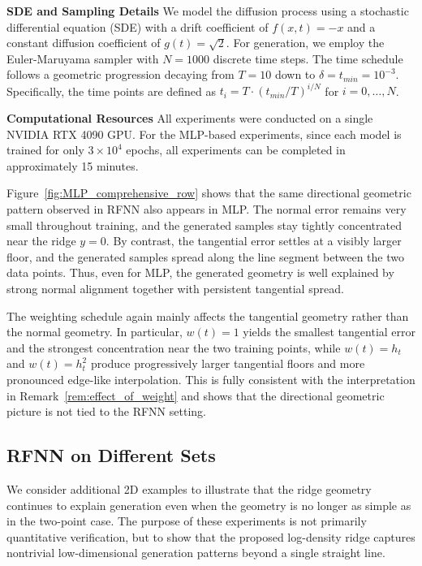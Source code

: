 \documentclass[11pt]{article}
\begin{document}
\noindent\textbf{SDE and Sampling Details} We model the diffusion process using a stochastic differential equation (SDE) with a drift coefficient of $f(x,t) = -x$ and a constant diffusion coefficient of $g(t) = \sqrt{2}$. For generation, we employ the Euler-Maruyama sampler with $N=1000$ discrete time steps. The time schedule follows a geometric progression decaying from $T=10$ down to $\delta = t_{min}=10^{-3}$. Specifically, the time points are defined as $t_i = T \cdot (t_{min}/T)^{i/N}$ for $i=0, \dots, N$.

\noindent\textbf{Computational Resources} All experiments were conducted on a single NVIDIA RTX 4090 GPU. For the MLP-based experiments, since each model is trained for only $3\times 10^4$ epochs, all experiments can be completed in approximately 15 minutes. 

Figure~\ref{fig:MLP_comprehensive_row} shows that the same directional geometric pattern observed in RFNN also appears in MLP. The normal error remains very small throughout training, and the generated samples stay tightly concentrated near the ridge $y=0$. By contrast, the tangential error settles at a visibly larger floor, and the generated samples spread along the line segment between the two data points. Thus, even for MLP, the generated geometry is well explained by strong normal alignment together with persistent tangential spread.

The weighting schedule again mainly affects the tangential geometry rather than the normal geometry. In particular, $w(t)=1$ yields the smallest tangential error and the strongest concentration near the two training points, while $w(t)=h_t$ and $w(t)=h_t^2$ produce progressively larger tangential floors and more pronounced edge-like interpolation. This is fully consistent with the interpretation in Remark~\ref{rem:effect_of_weight} and shows that the directional geometric picture is not tied to the RFNN setting.

\subsection{RFNN on Different Sets}\label{sec:RFNN More Examples}

We consider additional 2D examples to illustrate that the ridge geometry continues to explain generation even when the geometry is no longer as simple as in the two-point case. The purpose of these experiments is not primarily quantitative verification, but to show that the proposed log-density ridge captures nontrivial low-dimensional generation patterns beyond a single straight line.
\end{document}
